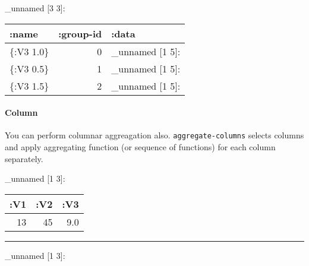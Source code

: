 \documentclass[]{article}
\newenvironment{Shaded}{\begin{snugshade}}{\end{snugshade}}
\newcommand{\KeywordTok}[1]{\textcolor[rgb]{0.13,0.29,0.53}{\textbf{#1}}}
\newcommand{\VariableTok}[1]{\textcolor[rgb]{0.00,0.00,0.00}{#1}}
\newcommand{\AttributeTok}[1]{\textcolor[rgb]{0.77,0.63,0.00}{#1}}
\newcommand{\NormalTok}[1]{#1}
\let\oldparagraph\paragraph
\renewcommand{\paragraph}[1]{\oldparagraph{#1}\mbox{}}
\begin{document}
\_unnamed {[}3 3{]}:

\begin{longtable}[]{@{}lrl@{}}
\toprule
:name & :group-id & :data\tabularnewline
\midrule
\endhead
\{:V3 1.0\} & 0 & \_unnamed {[}1 5{]}:\tabularnewline
\{:V3 0.5\} & 1 & \_unnamed {[}1 5{]}:\tabularnewline
\{:V3 1.5\} & 2 & \_unnamed {[}1 5{]}:\tabularnewline
\bottomrule
\end{longtable}

\paragraph{Column}\label{column}

You can perform columnar aggreagation also. \texttt{aggregate-columns}
selects columns and apply aggregating function (or sequence of
functions) for each column separately.

\begin{Shaded}
\end{Shaded}

\_unnamed {[}1 3{]}:

\begin{longtable}[]{@{}rrr@{}}
\toprule
:V1 & :V2 & :V3\tabularnewline
\midrule
\endhead
13 & 45 & 9.0\tabularnewline
\bottomrule
\end{longtable}

\begin{center}\rule{0.5\linewidth}{0.5pt}\end{center}

\begin{Shaded}
\end{Shaded}

\_unnamed {[}1 3{]}:
\end{document}
